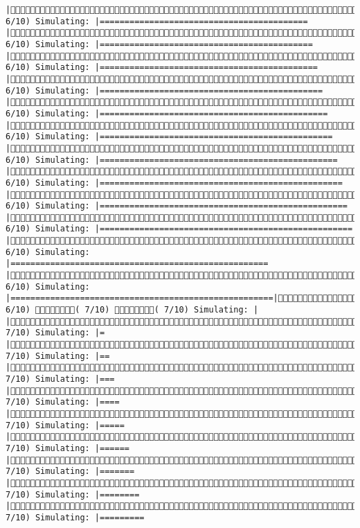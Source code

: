 \documentclass[]{article}
\begin{document}
\begin{verbatim}
|( 6/10) Simulating: |==========================================           |( 6/10) Simulating: |===========================================          |( 6/10) Simulating: |============================================         |( 6/10) Simulating: |=============================================        |( 6/10) Simulating: |==============================================       |( 6/10) Simulating: |===============================================      |( 6/10) Simulating: |================================================     |( 6/10) Simulating: |=================================================    |( 6/10) Simulating: |==================================================   |( 6/10) Simulating: |===================================================  |( 6/10) Simulating: |==================================================== |( 6/10) Simulating: |=====================================================|( 6/10) ( 7/10) ( 7/10) Simulating: |                                                     |( 7/10) Simulating: |=                                                    |( 7/10) Simulating: |==                                                   |( 7/10) Simulating: |===                                                  |( 7/10) Simulating: |====                                                 |( 7/10) Simulating: |=====                                                |( 7/10) Simulating: |======                                               |( 7/10) Simulating: |=======                                              |( 7/10) Simulating: |========                                             |( 7/10) Simulating: |=========                               
\end{verbatim}
\end{document}
